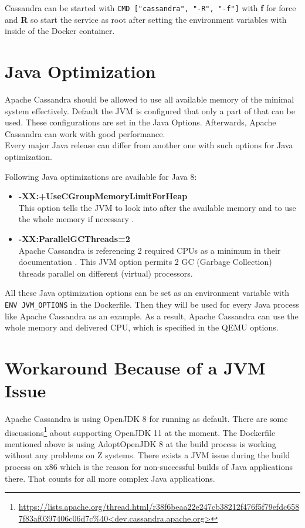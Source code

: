 Cassandra can be started with \lstinline!CMD ["cassandra", "-R", "-f"]! with \textbf{f} for force and \textbf{R} so start the service as root after setting the environment variables with inside of the Docker container.

\section{Java Optimization}

Apache Cassandra should be allowed to use all available memory of the minimal system effectively.
Default the JVM is configured that only a part of that can be used. These configurations are set in the Java Options.
Afterwards, Apache Cassandra can work with good performance. \\
Every major Java release can differ from another one with such options for Java optimization.

Following Java optimizations are available for Java 8: \\
\begin{itemize}
\item \textbf{-XX:+UseCGroupMemoryLimitForHeap}  \\
This option tells the JVM to look into  after the available memory and to use the whole memory if necessary \cite{Flood2017}.
\item \textbf{-XX:ParallelGCThreads=2} \\
Apache Cassandra is referencing  2 required CPUs as a minimum in their documentation \cite{Cassandra}.
This JVM option permits 2 GC (Garbage Collection) threads parallel on different (virtual) processors.
\end{itemize}

All these Java optimization options can be set as an environment variable with \lstinline!ENV JVM_OPTIONS! in the Dockerfile. Then they will be used for every Java process like Apache Cassandra as an example.
As a result, Apache Cassandra can use the whole memory and delivered CPU, which is specified in the \gls{QEMU} options.


\section{Workaround Because of a JVM Issue}\label{jvm-issue}

Apache Cassandra is using OpenJDK 8 for running as default. There are some discussions\footnote{\url{https://lists.apache.org/thread.html/r38f6beaa22e247cb38212f476f5f79efdc6587f83af0397406c06d7c\%40<dev.cassandra.apache.org>}} about supporting OpenJDK 11 at the moment. The Dockerfile mentioned above is using AdoptOpenJDK 8 at the build process is working without any problems on Z systems. There exists a JVM issue during the build process on x86 which is the reason for non-successful builds of Java applications there. That counts for all more complex Java applications.

